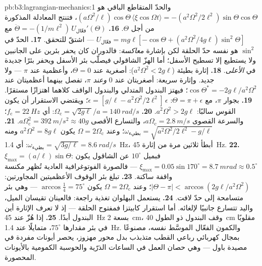 \begin{solution}{pb:b3:lagrangian-mechanics:1}
والحدّ المتقاطع الباقي هو
$(a\Omega^2/\ell)\cos\Theta\,\langle\xi\cos\Omega t\rangle =
-(a^2\Omega^2/2\ell^2)\sin\Theta\cos\Theta$، فتنتج المعادلة
المذكورة من أجل $\Theta$.
\textbf{16.} $\ddot\Theta = -(1/m\ell^2)\,U_{\text{فعّال}}'(\Theta)$ مع
$U_{\text{فعّال}} = mg\ell[-\cos\Theta + (a^2\Omega^2/4g\ell)
\sin^2\Theta]$ --- اشتقّ للتحقق.
\textbf{17.} الحدّ في $\sin^2$ هو نفسه حدّ الحلقة لكن بإشارة
\emph{معاكسة}: فالدوران كان يحفر بئرين على الجانبين ولا يستطيع
إلا تسطيح الأسفل؛ أما الهزّ الشاقولي فيصلّب بئر الأسفل ويحفر
بئرًا جديدة في \emph{الأعلى}.
\textbf{18.} إثارة بطيئة ($a^2\Omega^2 < 2g\ell$): أصغرية عند $\Theta =
0$، وأعظمية عند $\pi$ --- ولا جديد. وإثارة سريعة: أصغريتان عند $0$
\emph{وعند} $\pi$، تفصل بينهما أعظميتان عند $\cos\Theta^* =
-2g\ell/a^2\Omega^2$؛ فيهتز البندول المتدلي والبندول الواقف كلاهما
اهتزازًا مستقرًا.
\textbf{19.} بجوار $\pi$، مع $\Theta = \pi + \epsilon$:
$\ddot\epsilon = [g/\ell - a^2\Omega^2/2\ell^2]\,\epsilon$؛ ويقتضي
الاستقرار أن يكون القوس سالبًا: $a^2\Omega^2 > 2g\ell$.
\textbf{20.} $\Omega_{\text{c}} = \sqrt{2g\ell}/a = \qty{140}{rad/s}$:
أي $f_{\text{c}} = \qty{22}{Hz}$؛ والسرعة القصوى $a\Omega_{\text{c}} =
\qty{2.8}{m/s}$، والتسارع الأقصى $a\Omega_{\text{c}}^2 =
\qty{392}{m/s^2} \approx 40g$.
\textbf{21.} $\omega_{\text{بطيء}} = \sqrt{a^2\Omega^2/2\ell^2 -
g/\ell}$؛ وعند $\Omega = 2\Omega_{\text{c}}$ يكون $a^2\Omega^2 = 8g\ell$ ومنه
$\omega_{\text{بطيء}} = \sqrt{3g/\ell} = \qty{8.6}{rad/s}$: أي
\qty{1.4}{Hz}، أبطأ ثلاثين مرة من إثارة \qty{45}{Hz}.
\textbf{22.} $\xi_{\max} = (a/\ell)\sin\Theta$: فبميل $10^\circ$ عن
الشاقول يكون $\xi_{\max} = 0.05\sin170^\circ = \qty{8.7}{mrad}
\approx 0.5^\circ$ --- فالصورة الفوتوغرافية العادية تُظهر مكنسة
واقفة ساكنة.
\textbf{23.} تبلغ بئر الوقوف الأعظميتين المجاورتين:
$|\Theta - \pi| < \arccos(2g\ell/a^2\Omega^2)$؛ وعند $\Omega =
2\Omega_{\text{c}}$ يكون $\arccos\tfrac14 = 75^\circ$ --- وهي بئر
متسامحة إلى حدّ لافت.
\textbf{24.} يستعمل البهلوان تغذية راجعة: فالعينان تقيسان الميل،
واليد تتسارع جانبيًا لإلغائه. أما استقرار كابيتزا فمفتوح الحلقة
--- إذ لا تعرف الإثارة أين البندول أبدًا.
\textbf{25.} إذا هُزّ عند \qty{45}{Hz} بسعة \qty{2}{cm}، وقف
البندول ذو الطول \qty{40}{cm} مقلوبًا في بئر مقدارها $75^\circ$،
متمايلًا عند \qty{1.4}{Hz}. والكمون الفعّال الموسَّط نفسه، مصنوعًا
بمجال كهربائي رباعي القطب متذبذب بدل محور مهزوز، يحصر أيونات
مفردة في مصيدة باول --- وهي حصان العمل في الساعات الذرّية والحوسبة
الكمومية بالأيونات المحصورة.
\end{solution}
